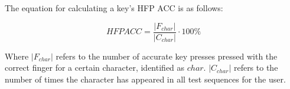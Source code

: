 \documentclass{report}
\begin{document}
The equation for calculating a key's HFP ACC is as follows:

\begin{equation}
	HFP ACC = \frac{|F_{char}|}{|C_{char}|} \cdot 100\%
\end{equation}

Where $|F_{char}|$ refers to the number of accurate key presses pressed with the
correct finger for a certain character, identified as $char$. $|C_{char}|$
refers to the number of times the character has appeared in all test sequences
for the user.


\newpage
\printbibliography[heading=bibintoc,title={References}]{}
\end{document}
